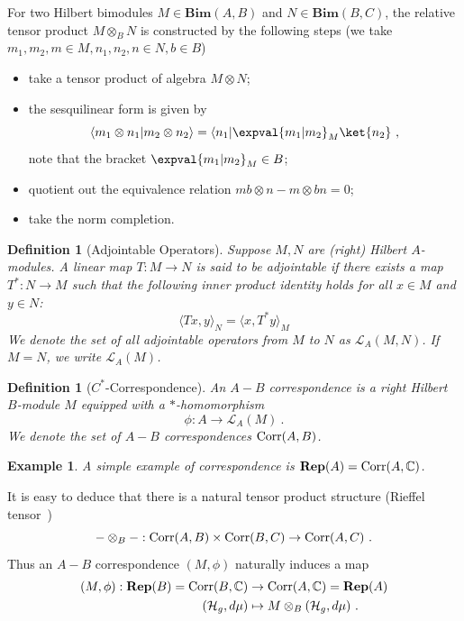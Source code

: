\documentclass[a4paper,11pt]{article}
\newtheorem{defn}[lemma]{Definition}
\newtheorem{exm}[lemma]{Example}
\newcommand{\Ch}{\mathrm{Ch}}
\newcommand{\CH}{\Ch_{\mu_1\mu_2}(Q_F,{t},{q})}
\newcommand{\Rep}{\textbf{Rep}}
\newcommand{\be}{\begin{equation}}
\newcommand{\ee}{\end{equation}}
\newcommand{\ba}{\begin{aligned}}
\newcommand{\ea}{\end{aligned}}
\def\bbC{\mathbb{C}}
\def\CH{\mathcal{H}}
\def\CL{\mathcal{L}}
\begin{document}
For two Hilbert bimodules $M\in \mathbf{Bim}(A,B)$ and $N\in\mathbf{Bim}(B,C) $, the relative tensor product $M\otimes _B N$ is constructed by the following steps (we take $m_1,m_2,m\in M, n_1,n_2,n\in N, b\in B$)
\begin{itemize}
    \item take a tensor product of algebra $M\otimes N$;
    \item the sesquilinear form is given by
    \be  \langle m_1\otimes n_1 | m_2\otimes n_2 \rangle  = \langle n_1| \expval{m_1|m_2}_M \ket{n_2}  \ ,  \ee
    note that the bracket $\expval{m_1|m_2}_M\in B$;
    \item quotient out the equivalence relation $mb\otimes n-m\otimes bn = 0$;
    \item take the norm completion.
\end{itemize}

\begin{defn}[Adjointable Operators]
Suppose $M,N$ are (right) Hilbert $A$-modules. A linear map $T: M \to N$ is said to be {\rm adjointable} if there exists a map $T^*: N \to M$ such that the following inner product identity holds for all $x \in M$ and $y \in N$:
\[
\langle Tx, y \rangle_N = \langle x, T^* y \rangle_M
\]
We denote the set of all adjointable operators from $M$ to $N$ as $\CL_A(M, N)$. If $M = N$, we write $\CL_A(M)$.
\end{defn}

\begin{defn}[$C^*$-Correspondence]
An $A-B$ {\rm correspondence} is a right Hilbert $B$-module $M$ equipped with a $*$-homomorphism 
\[
\phi: A \to \CL_A(M) \ .
\]
We denote the set of $A-B$ correspondences ${\rm Corr}(A,B)$.
\end{defn}
\begin{exm}
    A simple example of correspondence is $\Rep(A) = {\rm Corr}(A,\bbC)$.
\end{exm}
It is easy to deduce that there is a natural tensor product structure (Rieffel tensor~\cite{Rieffel1974InducedRO})
\be
-\otimes_B - : {\rm Corr}(A,B) \times {\rm Corr}(B,C) \to {\rm Corr}(A,C) \ .
\ee
Thus an $A-B$ correspondence $(M,\phi)$ naturally induces a map
\be\ba\label{eq:repbrepa}
(M,\phi): \Rep(B) = {\rm Corr}(B,\bbC) &\to {\rm Corr}(A,\bbC) =\Rep(A)\\
(\CH_g , d\mu) &\mapsto  M\otimes_B(\CH_g , d\mu) \ .
\ea\ee
\end{document}
